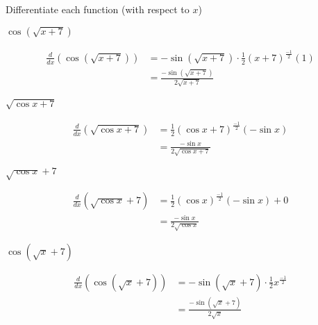\documentclass[handout,nooutcomes]{ximera}
\renewenvironment{freeResponse}{
\ifhandout\setbox0\vbox\bgroup\else
\begin{trivlist}\item[\hskip \labelsep\bfseries Solution:\hspace{2ex}]
\fi}
{\ifhandout\egroup\else
\end{trivlist}
\fi}
\newcommand{\ddx}{\frac{d}{dx}}
\begin{document}
\begin{problem}
Differentiate each function (with respect to $x$)
	\begin{enumerate}
	
	\item  $\cos \left( \sqrt{x+7} \right) $
		\begin{freeResponse}
		\begin{align*}
		\ddx \left( \cos \left( \sqrt{x+7} \right) \right) &= -\sin \left( \sqrt{x+7} \right) \cdot \frac{1}{2} (x+7)^{\frac{-1}{2}} (1) \\
		&= \frac{-\sin \left( \sqrt{x+7} \right) }{2 \sqrt{x+7}}
		\end{align*}
		\end{freeResponse}
		
	\item  $\sqrt{ \cos x + 7}$
		\begin{freeResponse}
		\begin{align*}
		\ddx \left( \sqrt{ \cos x + 7} \right) &= \frac{1}{2} \left( \cos x + 7 \right)^{\frac{-1}{2}} \left( -\sin x \right) \\
		&= \frac{- \sin x }{2 \sqrt{\cos x + 7 }}
		\end{align*}
		\end{freeResponse}
		
	\item $\sqrt{\cos x} + 7$
		\begin{freeResponse}
		\begin{align*}
		\ddx \left( \sqrt{\cos x} + 7 \right) &=  \frac{1}{2} \left( \cos x \right)^{\frac{-1}{2}} \left( -\sin x \right) + 0  \\
		&= \frac{- \sin x}{2 \sqrt{\cos x}}
		\end{align*}
		\end{freeResponse}
		
	\item  $\cos \left( \sqrt{x} + 7 \right)$
		\begin{freeResponse}
		\begin{align*}
		\ddx \left( \cos \left( \sqrt{x} + 7 \right) \right) &= - \sin \left( \sqrt{x} + 7 \right) \cdot \frac{1}{2} x^{\frac{-1}{2}} \\
		&=  \frac{- \sin \left( \sqrt{x} + 7 \right) }{2 \sqrt{x}}
		\end{align*}
		\end{freeResponse}
	\end{enumerate}
\end{problem}
\end{document}
